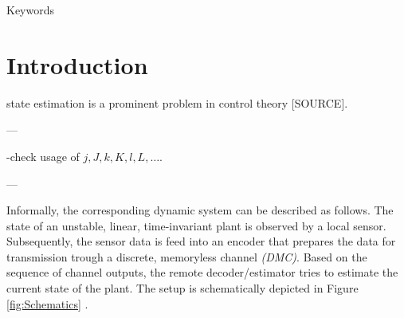 \documentclass[conference]{IEEEtran}
\newcommand{\sdummy}{{\color{red}[SOURCE]}}
\begin{document}
\begin{IEEEkeywords}
	\color{red} Keywords
\end{IEEEkeywords}

\section{Introduction}\label{sec:Introduction}
	 state estimation is a prominent problem in control theory \sdummy.  

---

	-check usage of \(j,J,k,K,l,L,\ldots\).

---

	Informally, the corresponding dynamic system can be described as follows. The state of an unstable, linear, time-invariant plant is observed by a local sensor. 
	Subsequently, the sensor data is feed into an encoder that prepares the data for transmission trough a discrete, memoryless channel \emph{(DMC)}. 
	Based on the sequence of channel outputs, the remote decoder/estimator tries to estimate the current state of the plant. The setup is schematically depicted in Figure \ref{fig:Schematics} 
	.
\end{document}
